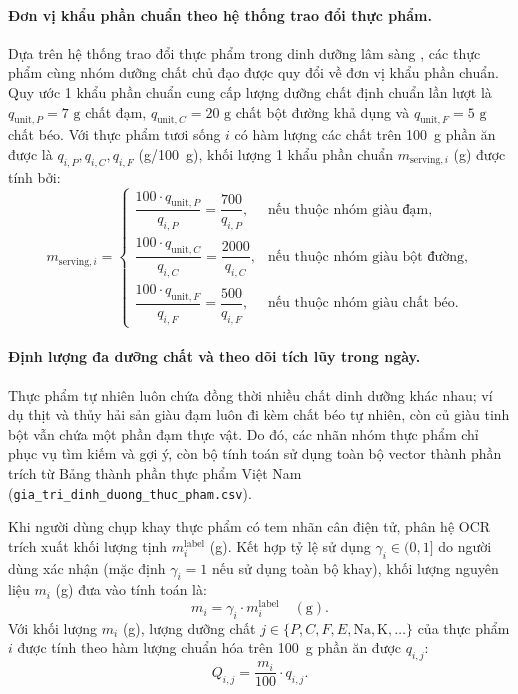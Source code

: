 \paragraph{Đơn vị khẩu phần chuẩn theo hệ thống trao đổi thực phẩm.}
Dựa trên hệ thống trao đổi thực phẩm trong dinh dưỡng lâm sàng \cite{wheeler2008food}, các thực phẩm cùng nhóm dưỡng chất chủ đạo được quy đổi về đơn vị khẩu phần chuẩn. Quy ước 1 khẩu phần chuẩn cung cấp lượng dưỡng chất định chuẩn lần lượt là $q_{\mathrm{unit}, P} = 7\text{ g}$ chất đạm, $q_{\mathrm{unit}, C} = 20\text{ g}$ chất bột đường khả dụng và $q_{\mathrm{unit}, F} = 5\text{ g}$ chất béo. Với thực phẩm tươi sống $i$ có hàm lượng các chất trên 100~g phần ăn được là $q_{i,P}, q_{i,C}, q_{i,F}$ (g/100~g), khối lượng 1 khẩu phần chuẩn $m_{\mathrm{serving}, i}$ (g) được tính bởi:
\begin{equation}
    m_{\mathrm{serving}, i} =
    \begin{cases}
        \dfrac{100 \cdot q_{\mathrm{unit}, P}}{q_{i,P}} = \dfrac{700}{q_{i,P}}, & \text{nếu thuộc nhóm giàu đạm},\\[10pt]
        \dfrac{100 \cdot q_{\mathrm{unit}, C}}{q_{i,C}} = \dfrac{2000}{q_{i,C}}, & \text{nếu thuộc nhóm giàu bột đường},\\[10pt]
        \dfrac{100 \cdot q_{\mathrm{unit}, F}}{q_{i,F}} = \dfrac{500}{q_{i,F}}, & \text{nếu thuộc nhóm giàu chất béo}.
    \end{cases}
    \label{eq:serving-mass}
\end{equation}

\paragraph{Định lượng đa dưỡng chất và theo dõi tích lũy trong ngày.}
Thực phẩm tự nhiên luôn chứa đồng thời nhiều chất dinh dưỡng khác nhau; ví dụ thịt và thủy hải sản giàu đạm luôn đi kèm chất béo tự nhiên, còn củ giàu tinh bột vẫn chứa một phần đạm thực vật. Do đó, các nhãn nhóm thực phẩm chỉ phục vụ tìm kiếm và gợi ý, còn bộ tính toán sử dụng toàn bộ vector thành phần trích từ Bảng thành phần thực phẩm Việt Nam (\nolinkurl{gia_tri_dinh_duong_thuc_pham.csv}).

Khi người dùng chụp khay thực phẩm có tem nhãn cân điện tử, phân hệ OCR trích xuất khối lượng tịnh $m_i^{\mathrm{label}}$ (g). Kết hợp tỷ lệ sử dụng $\gamma_i \in (0, 1]$ do người dùng xác nhận (mặc định $\gamma_i = 1$ nếu sử dụng toàn bộ khay), khối lượng nguyên liệu $m_i$ (g) đưa vào tính toán là:
\begin{equation}
    m_i = \gamma_i \cdot m_i^{\mathrm{label}} \quad (\mathrm{g}).
    \label{eq:consumed-mass}
\end{equation}
Với khối lượng $m_i$ (g), lượng dưỡng chất $j \in \{P, C, F, E, \mathrm{Na}, \mathrm{K}, \dots\}$ của thực phẩm $i$ được tính theo hàm lượng chuẩn hóa trên 100~g phần ăn được $q_{i,j}$:
\begin{equation}
    Q_{i,j} = \frac{m_i}{100} \cdot q_{i,j}.
    \label{eq:nutrient-matrix}
\end{equation}

